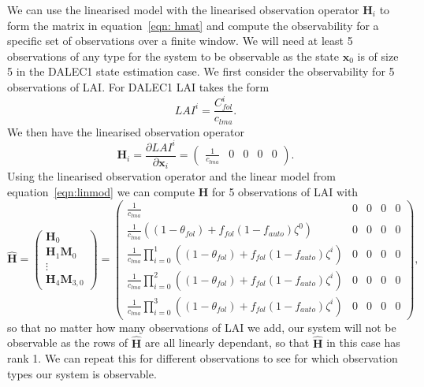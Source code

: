 \documentclass[11pt]{article}
\begin{document}
We can use the linearised model with the linearised observation operator $\textbf{H}_{i}$ to form the matrix in equation~\eqref{eqn: hmat} and compute the observability for a specific set of observations over a finite window. We will need at least 5 observations of any type for the system to be observable as the state $\textbf{x}_0$ is of size 5 in the DALEC1 state estimation case. We first consider the observability for 5 observations of LAI. For DALEC1 LAI takes the form
\begin{equation}
LAI^{i} = \frac{C_{fol}^{i}}{c_{lma}}.
\end{equation}
We then have the linearised observation operator
\begin{equation}
\textbf{H}_{i} = \frac{\partial LAI^{i}}{\partial \textbf{x}_{i}} =
\begin{pmatrix}
\frac{1}{c_{lma}} & 0 & 0 & 0 & 0
\end{pmatrix}.
\end{equation}
Using the linearised observation operator and the linear model from equation~\ref{eqn:linmod} we can compute $\hat{\textbf{H}}$ for 5 observations of LAI with
\begin{dmath}
\hat{\mathbf{H}} =
\begin{pmatrix}
\mathbf{H}_0 \\
\mathbf{H}_1\mathbf{M}_0 \\
\vdots \\
\mathbf{H}_{4}\mathbf{M}_{3,0}

\end{pmatrix}
=
\begin{pmatrix}
\frac{1}{c_{lma}} & 0 & 0 & 0 & 0 \\
\frac{1}{c_{lma}}((1-\theta_{fol})+f_{fol}(1-f_{auto})\zeta^0) & 0 & 0 & 0 & 0 \\
\frac{1}{c_{lma}}\prod_{i=0}^{1}((1-\theta_{fol})+f_{fol}(1-f_{auto})\zeta^i) & 0 & 0 & 0 & 0 \\
\frac{1}{c_{lma}}\prod_{i=0}^{2}((1-\theta_{fol})+f_{fol}(1-f_{auto})\zeta^i) & 0 & 0 & 0 & 0 \\
\frac{1}{c_{lma}}\prod_{i=0}^{3}((1-\theta_{fol})+f_{fol}(1-f_{auto})\zeta^i) & 0 & 0 & 0 & 0
\end{pmatrix},
\end{dmath}
so that no matter how many observations of LAI we add, our system will not be observable as the rows of $\hat{\textbf{H}}$ are all linearly dependant, so that $\hat{\textbf{H}}$ in this case has rank 1. We can repeat this for different observations to see for which observation types our system is observable. 
\end{document}
